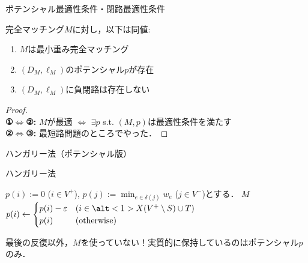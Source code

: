\documentclass[14pt,aspectratio=169,xcolor=dvipsnames,table,onlytextwidth,dvipdfmx]{beamer}
\begin{document}
\begin{frame}{ポテンシャル最適性条件・閉路最適性条件}
    \begin{lemma}
        完全マッチング$M$に対し，以下は同値:
        \begin{enumerate}
            \item $M$は最小重み完全マッチング
            \item $(D_M, \ell_M)$のポテンシャル$p$が存在
            \item $(D_M, \ell_M)$に負閉路は存在しない
        \end{enumerate}
    \end{lemma}

    \begin{proof} \\
    \textbf{①$\iff$②:} $M$が最適 $\iff$ $\exists p$ s.t. $(M, p)$は最適性条件を満たす \\
    \textbf{②$\iff$③:} 最短路問題のところでやった． 
    \end{proof}
\end{frame}


\begin{frame}{ハンガリー法（ポテンシャル版）}
    \small
    \begin{block}{ハンガリー法}
        \begin{algorithmic}[1]
            \STATE $p(i) := 0$ ($i \in V^+$), $p(j) := \min_{e \in \delta(j)} w_e$ ($j \in V^-$)とする．
                    \RETURN $M$ 
                    \STATE {}
                    \STATE {}
                    \STATE $p(i) \gets \begin{cases}
                        p(i) - \eps & (i \in \alt<1>{X}{(V^+ \setminus S) \cup T}) \\
                        p(i)  & (\text{otherwise})
                    \end{cases}$
                \ENDIF
            \ENDWHILE
        \end{algorithmic} 
    \end{block}

    \bigskip
    最後の反復以外，$M$を使っていない！実質的に保持しているのはポテンシャル$p$のみ．
\end{frame}
\end{document}
